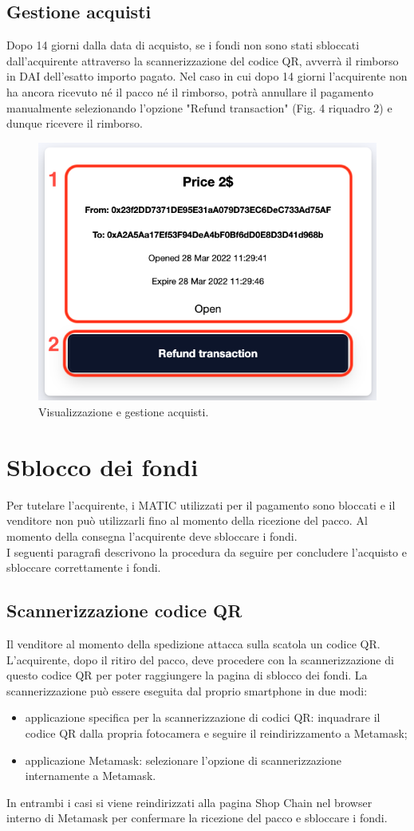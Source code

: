 \documentclass[a4paper, 12pt]{article}
\begin{document}
\subsection{Gestione acquisti}
Dopo 14 giorni dalla data di acquisto, se i fondi non sono stati sbloccati dall'acquirente attraverso la scannerizzazione del codice QR, avverrà il rimborso in DAI dell'esatto importo pagato. Nel caso in cui dopo 14 giorni l'acquirente non ha ancora ricevuto né il pacco né il rimborso, potrà annullare il pagamento manualmente selezionando l'opzione "Refund transaction" (Fig. 4 riquadro 2) e dunque ricevere il rimborso.
\FloatBarrier
\begin{figure}[!h]
\centering
\includegraphics[width=0.8\linewidth]{img/transazione_acquirente.png}
\caption{Visualizzazione e gestione acquisti.}
\end{figure}
\FloatBarrier
\section{Sblocco dei fondi}
Per tutelare l'acquirente, i MATIC utilizzati per il pagamento sono bloccati e il venditore non può utilizzarli fino al momento della ricezione del pacco. Al momento della consegna l'acquirente deve sbloccare i fondi.\\
I seguenti paragrafi descrivono la procedura da seguire per concludere l'acquisto e sbloccare correttamente i fondi.
\subsection{Scannerizzazione codice QR}
Il venditore al momento della spedizione attacca sulla scatola un codice QR. L'acquirente, dopo il ritiro del pacco, deve procedere con la scannerizzazione di questo codice QR per poter raggiungere la pagina di sblocco dei fondi. La scannerizzazione può essere eseguita dal proprio smartphone in due modi:
\begin{itemize}
\item applicazione specifica per la scannerizzazione di codici QR: inquadrare il codice QR dalla propria fotocamera e seguire il reindirizzamento a Metamask;
\item applicazione Metamask: selezionare l'opzione di scannerizzazione internamente a Metamask.
\end{itemize}
In entrambi i casi si viene reindirizzati alla pagina Shop Chain nel browser interno di Metamask per confermare la ricezione del pacco e sbloccare i fondi.
\end{document}
